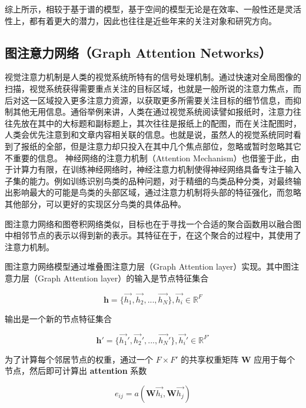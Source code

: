 \documentclass[UTF8]{ctexart}
\begin{document}
综上所示，相较于基于谱的模型，基于空间的模型无论是在效率、一般性还是灵活性上，都有着更大的潜力，因此也往往是近些年来的关注对象和研究方向。

\subsection{图注意力网络（Graph Attention Networks）}

视觉注意力机制是人类的视觉系统所特有的信号处理机制。通过快速对全局图像的扫描，视觉系统获得需要重点关注的目标区域，也就是一般所说的注意力焦点，而后对这一区域投入更多注意力资源，以获取更多所需要关注目标的细节信息，而抑制其他无用信息。通俗举例来讲，人类在通过视觉系统阅读譬如报纸时，注意力往往先放在其中的大标题和副标题上，其次往往是报纸上的配图，而在关注配图时，人类会优先注意到和文章内容相关联的信息。也就是说，虽然人的视觉系统同时看到了报纸的全部，但是注意力却只投入在其中几个焦点部位，忽略或暂时忽略其它不重要的信息。 神经网络的注意力机制（Attention Mechanism）也借鉴于此，由于计算力有限，在训练神经网络时，神经注意力机制使得神经网络具备专注于输入子集的能力。例如训练识别鸟类的品种问题，对于精细的鸟类品种分类，对最终输出影响最大的可能是鸟类的头部区域，通过注意力机制将头部的特征强化，而忽略其他部分，可以更好的实现区分鸟类的具体品种。

图注意力网络和图卷积网络类似，目标也在于寻找一个合适的聚合函数用以融合图中相邻节点的表示以得到新的表示。其特征在于，在这个聚合的过程中，其使用了注意力机制。 \par

图注意力网络模型通过堆叠图注意力层（Graph Attention layer）实现。其中图注意力层（Graph Attention layer）的输入是节点特征集合

\begin{equation} 
 \mathbf{h} = \{ \overrightarrow{h_1}, \overrightarrow{h_2}, ..., \overrightarrow{h_N} \}, \overrightarrow{h_i} \in \mathbb{R}^F
\end{equation}


输出是一个新的节点特征集合

\begin{equation} 
\mathbf{h}' = \{ \overrightarrow{h_1}', \overrightarrow{h_2}', ..., \overrightarrow{h_N}' \}, \overrightarrow{h_i}' \in \mathbb{R}^{F'}
\end{equation}


为了计算每个邻居节点的权重，通过一个 $F \times F'$ 的共享权重矩阵 $\mathbf{W}$ 应用于每个节点，然后即可计算出 \textbf{attention} 系数 

\begin{equation} 
e_{ij}=a(\mathbf{W}\overrightarrow{h_i},\mathbf{W}\overrightarrow{h_j})
\end{equation}
\end{document}
